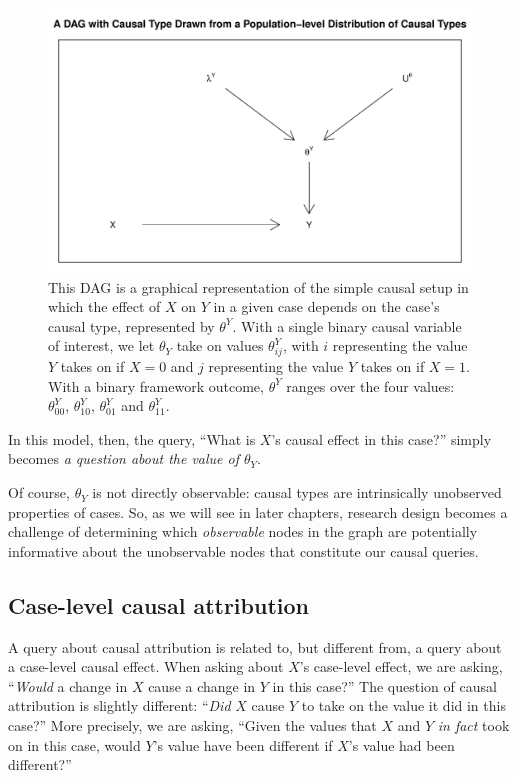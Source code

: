 \documentclass[12pt,]{book}
\begin{document}
\begin{figure}

{\centering \includegraphics[width=.5\textwidth]{ii_files/figure-latex/unnamed-chunk-15-1} 

}

\caption{\label{fig:casequery} This DAG is a graphical representation of the simple causal setup in which the effect of $X$ on $Y$ in a given case depends on the case's causal type, represented by $\theta^Y$. With a single binary causal variable of interest, we let $\theta_Y$ take on values $\theta^Y_{ij}$, with $i$ representing the value $Y$ takes on if $X=0$ and $j$ representing the value $Y$ takes on if $X=1$. With a binary framework outcome, $\theta^Y$ ranges over the four values: $\theta^Y_{00}$, $\theta^Y_{10}$, $\theta^Y_{01}$ and $\theta^Y_{11}$.}\label{fig:unnamed-chunk-15}
\end{figure}

In this model, then, the query, ``What is \(X\)'s causal effect in this case?'' simply becomes \emph{a question about the value of \(\theta_Y\)}.

Of course, \(\theta_Y\) is not directly observable: causal types are intrinsically unobserved properties of cases. So, as we will see in later chapters, research design becomes a challenge of determining which \emph{observable} nodes in the graph are potentially informative about the unobservable nodes that constitute our causal queries.

\hypertarget{case-level-causal-attribution}{%
\subsection{Case-level causal attribution}\label{case-level-causal-attribution}}

A query about causal attribution is related to, but different from, a query about a case-level causal effect. When asking about \(X\)'s case-level effect, we are asking, ``\emph{Would} a change in \(X\) cause a change in \(Y\) in this case?'' The question of causal attribution is slightly different: ``\emph{Did} \(X\) cause \(Y\) to take on the value it did in this case?'' More precisely, we are asking, ``Given the values that \(X\) and \(Y\) \emph{in fact} took on in this case, would \(Y\)'s value have been different if \(X\)'s value had been different?''
\end{document}
